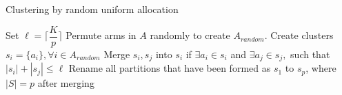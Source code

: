 	

\begin{algorithm}[t]
\caption{Clustering by random uniform allocation}
\label{alg:rua}
\begin{algorithmic}
\State Set $\ell=\bigg\lceil \dfrac{K}{p} \bigg\rceil$
\State Permute arms in $A$ randomly to create $A_{random}$.
\State Create clusters $s_{i}=\lbrace a_{i}\rbrace, \forall i\in A_{random}$
\State Merge $s_{i},s_{j}$ into $s_{i}$ if $\exists a_{i}\in s_{i} $ and $\exists a_{j}\in s_{j},$ such that $|s_{i}|+|s_{j}|\leq \ell$
\EndFor
\EndFor
\State Rename all partitions that have been formed as $s_{1}$ to $s_{p}$, where $|S|=p$ after merging
\end{algorithmic}
\end{algorithm}



